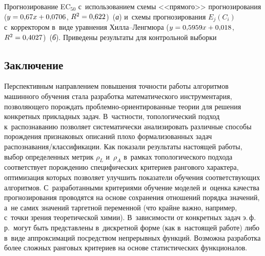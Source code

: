 \begin{table*}
\begin{center}
\end{center}
\vspace*{-3pt}

{\small Прогнозирование EC$_{50}$ с~использованием схемы <<прямого>> 
прогнозирования ($y\hm= 0{,}67x\hm+ 0{,}0706$, $R^2\hm= 0{,}622$)~(\textit{а}) и~схемы прогнозирования $E_j(C_i)$ с~корректором в~виде 
уравнения Хил\-ла--Ленг\-мю\-ра ($y\hm= 0{,}5959x\hm+0{,}018$, $R^2\hm= 0{,}4027$)~(\textit{б}). Приведены результаты для контрольной 
выборки}
\end{table*}


\begin{multicols}{2}

\section{Заключение}
    
Перспективным направлением повышения точ\-ности работы алгоритмов 
машинного обучения стала разработка математического инструментария, 
позволяющего порождать проб\-лем\-но-ори\-ен\-ти\-ро\-ван\-ные тео\-рии для решения 
конкретных прикладных задач. В~част\-ности, топологический подход 
к~распознаванию позволяет систематически анализировать различные способы 
порождения признаковых описаний плохо формализованных задач  
рас\-по\-зна\-ва\-ния/клас\-си\-фи\-ка\-ции. Как показали результаты настоящей 
работы, выбор определенных метрик $\rho_L$ и~$\rho_A$ в~рамках 
топологического подхода соответствует порождению специфических критериев 
рангового характера, оптимизация которых позволяет улучшить показатели 
обучения соответствующих алгоритмов. С~разработанными критериями 
обучение моделей и~оценка качества прогнозирования проводятся на основе 
сохранения отношений порядка значений, а~не самих значений таргетной 
переменной (что крайне важно, например, с~точки зрения теоретической 
химии). В~зависимости от конкретных задач э.\,ф.\,р.\ могут быть представлены в~дискретной форме (как в~настоящей работе) либо в~виде аппроксимаций 
посредством непрерывных функций. Возможна разработка более сложных 
ранговых критериев на основе статистических функционалов.


\end{multicols}
